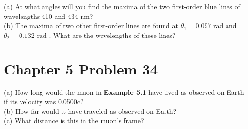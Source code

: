 \documentclass[11pt]{article}
\begin{document}
(a) At what angles will you find the maxima of the two first-order blue lines of wavelengths 410 and 434 nm? \\

(b) The maxima of two other first-order lines are found at \(\theta_1 = 0.097\) rad and \(\theta_2 = 0.132\) 
rad . What are the wavelengths of these lines?
 \newpage

 \section*{Chapter 5 Problem 34}
(a) How long would the muon in \textbf{Example 5.1} have lived as observed on Earth if its velocity was 
0.0500c? \\

(b) How far would it have traveled as observed on Earth? \\

(c) What distance is this in the muon’s frame?
 \newpage
\end{document}
